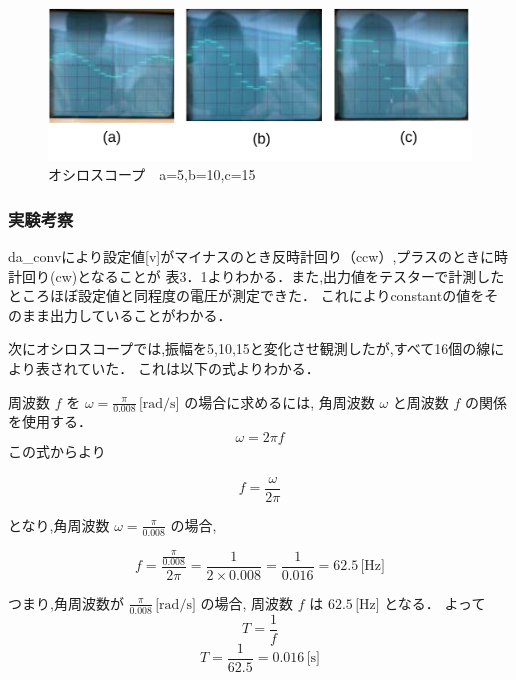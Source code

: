 \begin{figure}[h]
  \centering
  \includegraphics[scale=2]{sozai/5.pdf}
  \caption{オシロスコープ　a=5,b=10,c=15}
\end{figure}

\subsubsection{実験考察}
da\_convにより設定値[v]がマイナスのとき反時計回り（ccw）,プラスのときに時計回り(cw)となることが
表3．1よりわかる．また,出力値をテスターで計測したところほぼ設定値と同程度の電圧が測定できた．
これによりconstantの値をそのまま出力していることがわかる．

次にオシロスコープでは,振幅を5,10,15と変化させ観測したが,すべて16個の線により表されていた．
これは以下の式よりわかる．

周波数 \( f \) を \( \omega = \frac{\pi}{0.008} \, \text{[rad/s]} \) の場合に求めるには,
角周波数 \( \omega \) と周波数 \( f \) の関係を使用する．
\begin{equation}
  \omega = 2\pi f
\end{equation}
この式からより

\begin{equation}
  f = \frac{\omega}{2\pi}
\end{equation}

となり,角周波数 \( \omega = \frac{\pi}{0.008} \) の場合,

\begin{equation}
  f = \frac{\frac{\pi}{0.008}}{2\pi} = \frac{1}{2 \times 0.008} = \frac{1}{0.016} = 62.5 \, \text{[Hz]}
\end{equation}

つまり,角周波数が \( \frac{\pi}{0.008} \, \text{[rad/s]} \) の場合,
周波数 \( f \) は \( 62.5 \, \text{[Hz]} \) となる．
よって
\begin{equation}
  T = \frac{1}{f}
\end{equation}
\begin{equation}
  T = \frac{1}{62.5} = 0.016 \, \text{[s]}
\end{equation}

